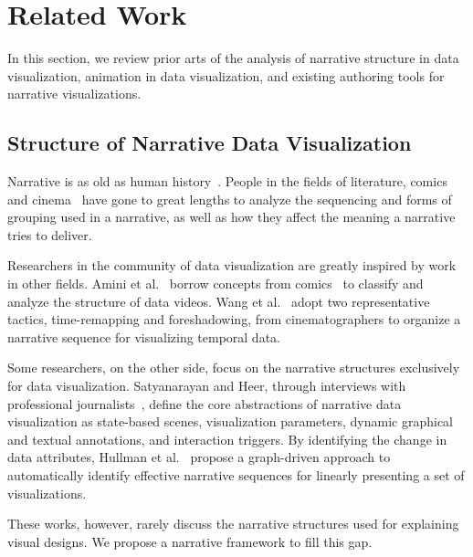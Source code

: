 \section {Related Work}
In this section, we review prior arts of the analysis of narrative structure in data visualization, animation in data visualization, and existing authoring tools for narrative visualizations.

\subsection{Structure of Narrative Data Visualization}
Narrative is as old as human history~\cite{cunningham_culture_2009}.  People in the fields of literature, comics~\cite{cohn_visual_2013} and cinema~\cite{schmidt_living_2017} have gone to great lengths to analyze the sequencing and forms of grouping used in a narrative, as well as how they affect the meaning a narrative tries to deliver. 

Researchers in the community of data visualization are greatly inspired by work in other fields.
Amini et al.~\cite{amini_understanding_2015} borrow concepts from comics~\cite{cohn_visual_2013} to classify and analyze the structure of data videos. Wang et al.~\cite{wang_animated_2016} adopt two representative tactics, time-remapping and foreshadowing, from cinematographers to organize a narrative sequence for visualizing temporal data. 

Some researchers, on the other side, focus on the narrative structures exclusively for data visualization. 
Satyanarayan and Heer, through interviews with professional journalists~\cite{satyanarayan_authoring_2014}, define the core abstractions of narrative data visualization as state-based scenes, visualization parameters, dynamic graphical and textual annotations, and interaction triggers. By identifying the change in data attributes, Hullman et al.~\cite{hullman_deeper_2013} propose a graph-driven approach to automatically identify effective narrative sequences for linearly presenting a set of visualizations. 

These works, however, rarely discuss the narrative structures used for explaining visual designs. We propose a narrative framework to fill this gap.

